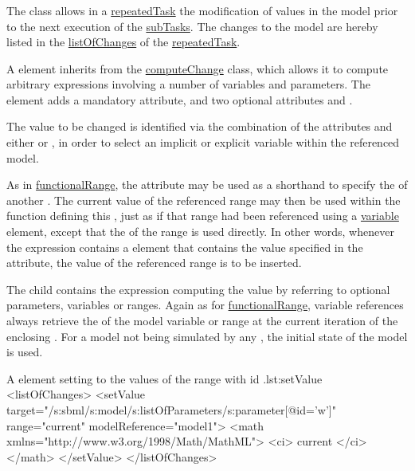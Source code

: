 \subsubsection{}
\label{class:setValue}
The  class allows in a \hyperref[class:repeatedTask]{repeatedTask} the modification of values in the model prior to the next execution of the \hyperref[class:subTask]{subTasks}. The changes to the model are hereby listed in the \hyperref[sec:listOfChanges]{listOfChanges} of the \hyperref[class:repeatedTask]{repeatedTask}.

A  element inherits from the \hyperref[class:computeChange]{computeChange} class, which allows it to compute arbitrary expressions involving a number of variables and parameters. The element  adds a mandatory  attribute, and two optional attributes  and .

The value to be changed is identified via the combination of the attributes  and either  or , in order to select an implicit or explicit variable within the referenced model.

As in \hyperref[class:functionalRange]{functionalRange}, the attribute  may be used as a shorthand to specify the  of another . The current value of the referenced range may then be used within the function defining this , just as if that range had been referenced using a \hyperref[class:variable]{variable} element, except that the  of the range is used directly. In other words, whenever the expression contains a  element that contains the value specified in the  attribute, the value of the referenced range is to be inserted.

The child  contains the expression computing the value by referring to optional parameters, variables or ranges.
Again as for \hyperref[class:functionalRange]{functionalRange}, variable references always retrieve the  of the model variable or range at the current iteration of the enclosing . For a model not being simulated by any , the initial state of the model is used.

\begin{myXmlLst}{A  element setting  to the values of the range with id .}{lst:setValue}
<listOfChanges>
	<setValue target="/s:sbml/s:model/s:listOfParameters/s:parameter[@id='w']"
		range="current" modelReference="model1">
		<math xmlns="http://www.w3.org/1998/Math/MathML">
			<ci> current </ci>
		</math>
	</setValue>
</listOfChanges>
\end{myXmlLst}
